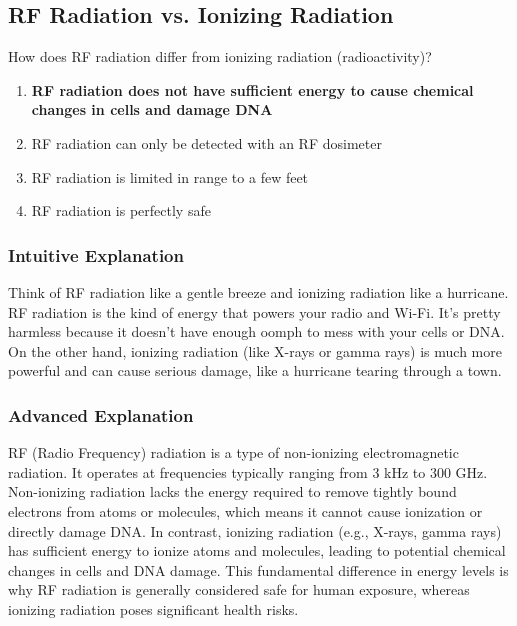 \subsection{RF Radiation vs. Ionizing Radiation}
\label{T0C12}

\begin{tcolorbox}[colback=gray!10!white,colframe=black!75!black,title=T0C12]
How does RF radiation differ from ionizing radiation (radioactivity)?
\begin{enumerate}[noitemsep]
    \item \textbf{RF radiation does not have sufficient energy to cause chemical changes in cells and damage DNA}
    \item RF radiation can only be detected with an RF dosimeter
    \item RF radiation is limited in range to a few feet
    \item RF radiation is perfectly safe
\end{enumerate}
\end{tcolorbox}

\subsubsection*{Intuitive Explanation}
Think of RF radiation like a gentle breeze and ionizing radiation like a hurricane. RF radiation is the kind of energy that powers your radio and Wi-Fi. It’s pretty harmless because it doesn’t have enough oomph to mess with your cells or DNA. On the other hand, ionizing radiation (like X-rays or gamma rays) is much more powerful and can cause serious damage, like a hurricane tearing through a town.

\subsubsection*{Advanced Explanation}
RF (Radio Frequency) radiation is a type of non-ionizing electromagnetic radiation. It operates at frequencies typically ranging from 3 kHz to 300 GHz. Non-ionizing radiation lacks the energy required to remove tightly bound electrons from atoms or molecules, which means it cannot cause ionization or directly damage DNA. In contrast, ionizing radiation (e.g., X-rays, gamma rays) has sufficient energy to ionize atoms and molecules, leading to potential chemical changes in cells and DNA damage. This fundamental difference in energy levels is why RF radiation is generally considered safe for human exposure, whereas ionizing radiation poses significant health risks.